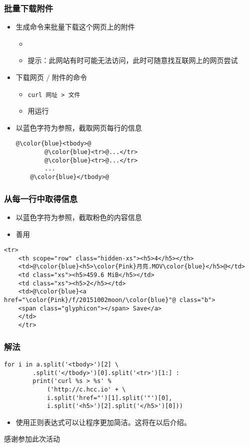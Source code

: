 \begin{CJK}{UTF8}{gbsn}
\begin{frame} [fragile]
	\frametitle{批量下载附件}
	\begin{itemize}
	\item 生成命令来批量下载这个网页上的附件
		\begin{itemize}
		\item {}
		\item 提示：此网站有时可能无法访问，此时可随意找互联网上的网页尝试
		\end{itemize}
	\item 下载网页 / 附件的命令
		\begin{itemize}
		\item \texttt{curl 网址 > 文件}
		\item 用运行
		\end{itemize}
	\item 以{\color{blue}蓝色}字符为参照，截取网页每行的信息
	\begin{lstlisting}[style=pythonstyle, gobble=4, texcl, escapechar=@]
	@\color{blue}<tbody>@
		@\color{blue}<tr>@...</tr>
		@\color{blue}<tr>@...</tr>
		...
	@\color{blue}</tbody>@
	\end{lstlisting}
	\end{itemize}
\end{frame}

\begin{frame} [fragile]
	\frametitle{从每一行中取得信息}
	\begin{itemize}
	\item 以{\color{blue}蓝色}字符为参照，截取{\color{Pink}粉色}的内容信息
	\item 善用 
	\end{itemize}
	\begin{lstlisting}[basicstyle=\ttfamily, gobble=4, texcl, escapechar=@]
	<tr>
	<th scope="row" class="hidden-xs"><h5>4</h5></th>
	<td>@\color{blue}<h5>\color{Pink}月亮.MOV\color{blue}</h5>@</td>
	<td class="xs"><h5>459.6 MiB</h5></td>
	<td class="xs"><h5>2</h5></td>
	<td>@\color{blue}<a href="\color{Pink}/f/20151002moon/\color{blue}"@ class="b">
	<span class="glyphicon"></span> Save</a>
	</td>
	</tr>
	\end{lstlisting}
\end{frame}

\begin{frame} [fragile]
	\frametitle{解法}
	\begin{lstlisting}[style=pythonstyle, gobble=4, texcl, escapechar=@]
	for i in a.split('<tbody>')[2] \
		.split('</tbody>')[0].split('<tr>')[1:] :
		print('curl %s > %s' %
			('http://c.hcc.io' + \
			i.split('href="')[1].split('"')[0],
			i.split('<h5>')[2].split('</h5>')[0]))
	\end{lstlisting}
	\begin{itemize}
	\item 使用正则表达式可以让程序更加简洁。这将在以后介绍。
	\end{itemize}
\end{frame}

\PreLastFrame
\begin{frame}
	\centerline{\fontsize{32}{32}\selectfont 感谢参加此次活动}
\end{frame}

\newpage
\end{CJK}


